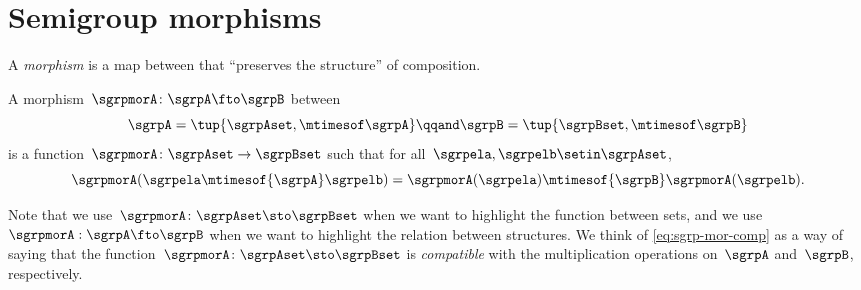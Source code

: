 

\section{Semigroup morphisms}
\label{sec:semigroup-morphisms}

A \emph{morphism} is a map between  that ``preserves the structure'' of composition.



\begin{ctdefinition}
    \label{def:semigroup-mor}
    A morphism~$\sgrpmorA\colon \sgrpA \fto \sgrpB$ between  \begin{equation}
        \label{eq:sgrpAB}
        \sgrpA = \tup{\sgrpAset, \mtimesof\sgrpA}
        \qqand
        \sgrpB = \tup{\sgrpBset, \mtimesof\sgrpB}
    \end{equation}
    is a function~$\sgrpmorA\colon \sgrpAset \to \sgrpBset$ such that for all~$\sgrpela, \sgrpelb \setin \sgrpAset$,
    \begin{equation}
        \label{eq:sgrp-mor-comp}
        \sgrpmorA(\sgrpela \mtimesof{\sgrpA} \sgrpelb) = \sgrpmorA (\sgrpela) \mtimesof{\sgrpB} \sgrpmorA(\sgrpelb).
    \end{equation}
\end{ctdefinition}

Note that we use~$\sgrpmorA\colon \sgrpAset \sto \sgrpBset$ when we want to highlight the function between sets, and we use~$\sgrpmorA: \sgrpA \fto \sgrpB$ when we want to highlight the relation between  structures.
We think of \cref{eq:sgrp-mor-comp} as a way of saying that the function~$\sgrpmorA\colon \sgrpAset \sto \sgrpBset$  is \emph{compatible} with the multiplication operations on~$\sgrpA$ and~$\sgrpB$, respectively.


